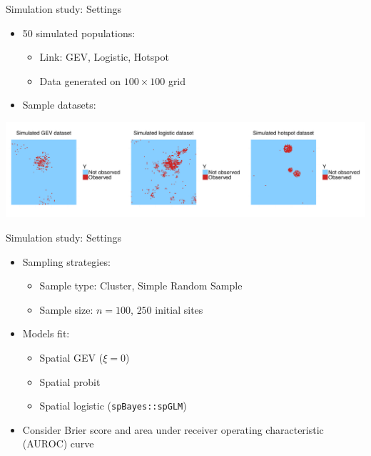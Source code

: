 \documentclass{beamer}
\begin{document}
\begin{frame}{Simulation study: Settings}
	\begin{itemize} \setlength{\itemsep}{1em}
		\item 50 simulated populations: \vspace{0.5em}
		\begin{itemize} \setlength{\itemsep}{0.5em}
			\item Link: GEV, Logistic, Hotspot
			\item Data generated on $100 \times 100$ grid
		\end{itemize}
		\item Sample datasets:
  \end{itemize}
	\begin{center}
		\includegraphics[width=\linewidth]{simulateddata.pdf}
	\end{center}
\end{frame}

\begin{frame}{Simulation study: Settings}
	\begin{itemize} \setlength{\itemsep}{1em}
		\item Sampling strategies: \vspace{0.5em}
		\begin{itemize} \setlength{\itemsep}{0.5em}
			\item Sample type: Cluster, Simple Random Sample
			\item Sample size: $n = 100$, $250$ initial sites
		\end{itemize}
		\item Models fit: \vspace{0.5em}
		\begin{itemize} \setlength{\itemsep}{0.5em}
			\item Spatial GEV ($\xi = 0$)
			\item Spatial probit
			\item Spatial logistic (\texttt{spBayes::spGLM})
		\end{itemize}
		\item Consider Brier score and area under receiver operating characteristic (AUROC) curve
	\end{itemize}
\end{frame}
\end{document}
